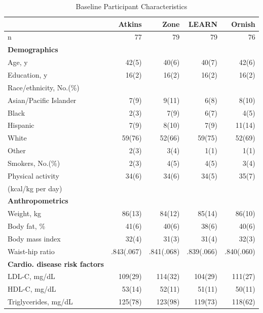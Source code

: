 \documentclass[11pt, chapterprefix=true]{scrbook}\usepackage[]{graphicx}\usepackage[]{color}
\begin{document}

\begin{table}[ht]
\caption{Baseline Participant Characteristics}
\begin{tabular}{@{} lrrrr @{}} \hline
         & Atkins & Zone & LEARN & Ornish \\ \hline
n        & 77     & 79   &    79 &  76 \\
\textbf{Demographics} &  &  &  &  \\
Age, y       & 42(5) & 40(6) & 40(7) & 42(6) \\
Education, y & 16(2) & 16(2) & 16(2) & 16(2) \\
Race/ethnicity, No.(\%) &  &  &  &  \\
Asian/Pacific Islander & 7(9) & 9(11) & 6(8) & 8(10) \\
Black                  & 2(3) & 7(9)  & 6(7) & 4(5) \\
Hispanic               & 7(9) & 8(10) & 7(9) & 11(14) \\
White                  & 59(76) & 52(66) & 59(75) & 52(69) \\
Other                  & 2(3)   & 3(4)   & 1(1)   & 1(1) \\
Smokers, No.(\%)       & 2(3)   & 4(5)   & 4(5)   & 3(4) \\
Physical activity      & 34(6)  & 34(6)  & 34(5)  & 35(7) \\
(kcal/kg per day)  &  &  &  &  \\
\textbf{Anthropometrics}    &  &  &  & \\
Weight, kg             & 86(13) & 84(12) & 85(14) & 86(10) \\
Body fat, \%           & 41(6)  & 40(6)  & 38(6)  & 40(6) \\
Body mass index        & 32(4)  & 31(3)  & 31(4)  & 32(3) \\
Waist-hip ratio        & .843(.067) & .841(.068) & .839(.066) & .840(.060) \\
\textbf{Cardio. disease risk factors} & & & & \\
LDL-C, mg/dL           & 109(29) & 114(32) & 104(29) & 111(27) \\
HDL-C, mg/dL           & 53(14)  & 52(11)  & 51(11) & 50(11) \\
Triglycerides, mg/dL   & 125(78) & 123(98) & 119(73) & 118(62) \\

\end{tabular}
\end{table}
\end{document}
